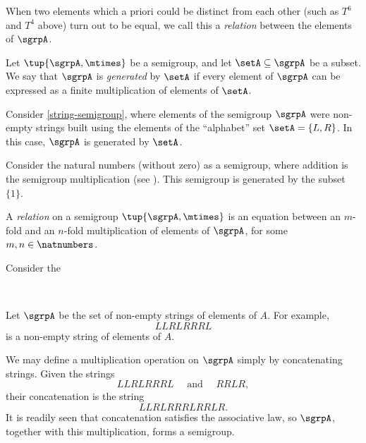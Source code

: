 When two elements which a priori could be distinct from each other (such as $T^6$ and $T^4$ above) turn out to be equal, we call this a \emph{relation} between the elements of $\sgrpA$. 

\begin{definition}
Let $\tup{\sgrpA, \mtimes}$ be a semigroup, and let $\setA \subseteq \sgrpA$ be a subset. We say that $\sgrpA$ is \emph{generated} by $\setA$ if every element of $\sgrpA$ can be expressed as a finite multiplication of elements of $\setA$. 
\end{definition}

\begin{example}
Consider \cref{string-semigroup}, where elements of the semigroup $\sgrpA$ were non-empty strings built using the elements of the ``alphabet'' set $\setA = \{ L, R \}$. In this case, $\sgrpA$ is generated by $\setA$. 
\end{example}


\begin{example}
Consider the natural numbers (without zero) as a semigroup, where addition is the semigroup multiplication (see \label{natnum-semigroup}). This semigroup is generated by the subset $\{1 \}$. 
\end{example}

\begin{definition}
A \emph{relation} on a semigroup $\tup{\sgrpA, \mtimes}$ is an equation between an $m$-fold and an $n$-fold multiplication of elements of $\sgrpA$, for some $m, n \in \natnumbers$. 
\end{definition}

\begin{example}
Consider the 
\end{example}


\


Let $\sgrpA$ be the set of non-empty strings of elements of $A$. For example, 
$$ LLRLRRRL $$ 
is a non-empty string of elements of $A$. 

We may define a multiplication operation on $\sgrpA$ simply by concatenating strings. Given the strings
$$ LLRLRRRL  \quad \text{ and } \quad RRLR, $$ 
their concatenation is the string
$$ LLRLRRRLRRLR.$$
It is readily seen that concatenation satisfies the associative law, so $\sgrpA$, together with this multiplication, forms a semigroup. 